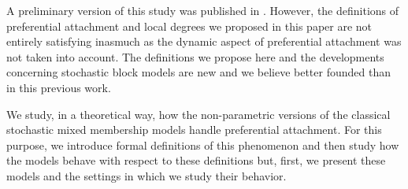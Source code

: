 \documentclass[12pt]{article}
\begin{document}

A preliminary version of this study was published in \cite{dulac-dsaa}. However, the definitions of preferential attachment and local degrees we proposed in this paper are not entirely satisfying inasmuch as the dynamic aspect of preferential attachment was not taken into account. The definitions we propose here and the developments concerning stochastic block models are new and we believe better founded than in this previous work.

We study, in a theoretical way, how the non-parametric versions of the classical stochastic mixed membership models handle preferential attachment. For this purpose, we introduce formal definitions of this phenomenon and then study how the models behave with respect  to these definitions but, first,  we present these models and the settings in which we study their behavior.



~\\




%
\end{document}
